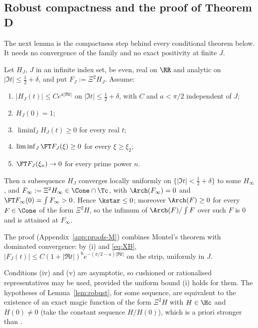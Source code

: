 \subsection{Robust compactness and the proof of Theorem D}\label{ssec:thmM}

The next lemma is the compactness step behind
every conditional theorem below. It needs no convergence of the family and no exact positivity at finite $J$.

\begin{lemma}\label{lem:robust}
Let $H_J$, $J$ in an infinite index set, be even, real on $\RR$ and analytic on $\lvert\Im t\rvert\le\frac12+\delta$,
and put $F_J:=\Xi^2H_J$. Assume:
\begin{enumerate}[label=(\roman*),leftmargin=2em]
\item $\lvert H_J(t)\rvert\le Ce^{a\lvert\Re t\rvert}$ on $\lvert\Im t\rvert\le\frac12+\delta$, with $C$ and $a<\pi/2$ independent of $J$;
\item $H_J(0)=1$;
\item $\liminf_JH_J(t)\ge0$ for every real $t$;
\item $\liminf_J\FT F_J(\xi)\ge0$ for every $\xi\ge\xi_2$;
\item $\FT F_J(\xi_n)\to0$ for every prime power $n$.
\end{enumerate}
Then a subsequence $H_J$ converges locally uniformly on $\{\lvert\Im t\rvert<\frac12+\delta\}$ to some $H_\infty$, and
$F_\infty:=\Xi^2H_\infty\in\Cone\cap\Tc$, with $\Arch(F_\infty)=0$ and $\FT F_\infty(0)=\int F_\infty>0$. Hence
$\kstar\le0$; moreover $\Arch(F)\ge0$ for every $F\in\Cone$ of the form $\Xi^2H$, so the infimum of
$\Arch(F)/\int F$ over such $F$ is $0$ and is attained at $F_\infty$.
\end{lemma}

The proof (Appendix~\ref{app:proofs-M}) combines Montel's theorem with dominated convergence: by (i) and
\eqref{eq:XB}, $\lvert F_J(t)\rvert\le C(1+\lvert\Re t\rvert)^6e^{-(\pi/2-a)\lvert\Re t\rvert}$ on the strip, uniformly in $J$.

Conditions (iv) and (v) are
asymptotic, so cushioned or rationalised representatives may be used, provided the uniform bound (i)
holds for them. The hypotheses of Lemma~\ref{lem:robust}, for some sequence, are equivalent to the existence of an
exact magic function of the form $\Xi^2H$ with $H\in\Hc$ and $H(0)\ne0$ (take the constant sequence $H/H(0)$), which is a priori
stronger than \condS.

